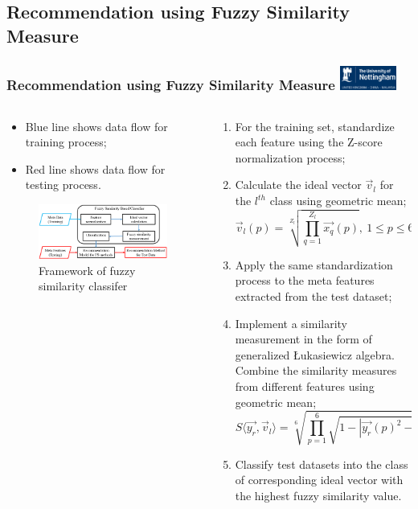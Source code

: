 \documentclass[aspectratio=1610]{beamer}
\newcommand{\UoN}
  {\hfill {\includegraphics[height=0.8cm]{nott_logo/nott_logo_white.png}}}
\begin{document}
\subsection{Recommendation using Fuzzy Similarity Measure}
\begin{frame}
\frametitle{Recommendation using Fuzzy Similarity Measure \UoN}
\begin{columns}
	\begin{column}{0.5\textwidth}
		\begin{itemize}\footnotesize
			\item Blue line shows data flow for training process;
			\item Red line shows data flow for testing process.
		\end{itemize}
		
		\begin{figure}
			\includegraphics[scale=0.3]{Figures/Similarity_Classifier.png}
			\caption{\scriptsize{Framework of fuzzy similarity classifer}}
		\end{figure}
	\end{column}

	\begin{column}{0.5\textwidth}
		\begin{enumerate}\scriptsize
			\item For the training set, standardize each feature using the Z-score normalization process;
			\item Calculate the ideal vector $\vec{v}_l$ for the $l^{th}$ class using geometric mean;
			\begin{equation}\nonumber
			\vec{v}_l(p) = \sqrt[Z_l]{\prod_{q=1}^{Z_l}\vec{x_q}(p)}, \  1 \leq p \leq 6
			\end{equation}
			\item Apply the same standardization process to the meta features extracted from the test dataset;	
			\item Implement a similarity measurement in the form of generalized \L ukasiewicz algebra. Combine the similarity measures from different features using geometric mean;
			\begin{equation}\label{eqGeo}
			S \langle \vec{y_r}, \vec{v}_l \rangle = \sqrt[6]{\prod_{p=1}^{6} \sqrt{1 - |\vec{y_r}(p)^2- \vec{v}_l(p)^2|}}
			\end{equation}
			\item Classify test datasets into the class of corresponding ideal vector with the highest fuzzy similarity value.
		\end{enumerate}
	\end{column}
\end{columns}
\end{frame}
\end{document}
